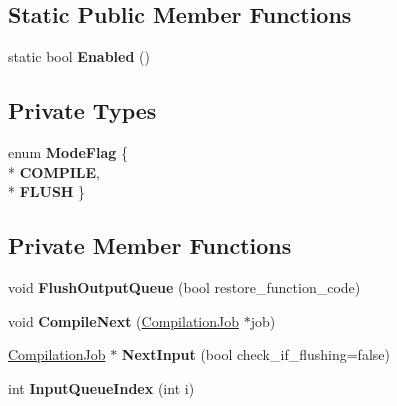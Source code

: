 \subsection*{Static Public Member Functions}
\begin{DoxyCompactItemize}
\item 
static bool {\bfseries Enabled} ()\hypertarget{classv8_1_1internal_1_1_optimizing_compile_dispatcher_a5242d544a43212fa6496ef4e3441b050}{}\label{classv8_1_1internal_1_1_optimizing_compile_dispatcher_a5242d544a43212fa6496ef4e3441b050}

\end{DoxyCompactItemize}
\subsection*{Private Types}
\begin{DoxyCompactItemize}
\item 
enum {\bfseries Mode\+Flag} \{ \\*
{\bfseries C\+O\+M\+P\+I\+LE}, 
\\*
{\bfseries F\+L\+U\+SH}
 \}\hypertarget{classv8_1_1internal_1_1_optimizing_compile_dispatcher_abda1adc399a9d61f642cc1cd82242564}{}\label{classv8_1_1internal_1_1_optimizing_compile_dispatcher_abda1adc399a9d61f642cc1cd82242564}

\end{DoxyCompactItemize}
\subsection*{Private Member Functions}
\begin{DoxyCompactItemize}
\item 
void {\bfseries Flush\+Output\+Queue} (bool restore\+\_\+function\+\_\+code)\hypertarget{classv8_1_1internal_1_1_optimizing_compile_dispatcher_a266121515cf300f5356894cfcf96bfcc}{}\label{classv8_1_1internal_1_1_optimizing_compile_dispatcher_a266121515cf300f5356894cfcf96bfcc}

\item 
void {\bfseries Compile\+Next} (\hyperlink{classv8_1_1internal_1_1_compilation_job}{Compilation\+Job} $\ast$job)\hypertarget{classv8_1_1internal_1_1_optimizing_compile_dispatcher_a6b32a88602fa87d699cca4da7ce0e50a}{}\label{classv8_1_1internal_1_1_optimizing_compile_dispatcher_a6b32a88602fa87d699cca4da7ce0e50a}

\item 
\hyperlink{classv8_1_1internal_1_1_compilation_job}{Compilation\+Job} $\ast$ {\bfseries Next\+Input} (bool check\+\_\+if\+\_\+flushing=false)\hypertarget{classv8_1_1internal_1_1_optimizing_compile_dispatcher_a07234f50ffc8510e57af1c15c9ecfc7b}{}\label{classv8_1_1internal_1_1_optimizing_compile_dispatcher_a07234f50ffc8510e57af1c15c9ecfc7b}

\item 
int {\bfseries Input\+Queue\+Index} (int i)\hypertarget{classv8_1_1internal_1_1_optimizing_compile_dispatcher_a0cf47f110cf184b4dd981492ce3188a6}{}\label{classv8_1_1internal_1_1_optimizing_compile_dispatcher_a0cf47f110cf184b4dd981492ce3188a6}

\end{DoxyCompactItemize}
